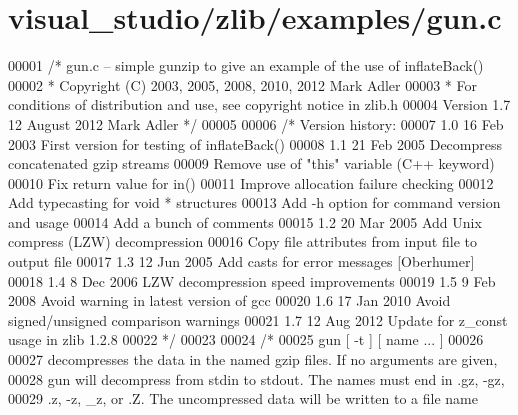 \hypertarget{visual__studio_2zlib_2examples_2gun_8c_source}{}\section{visual\+\_\+studio/zlib/examples/gun.c}
\label{visual__studio_2zlib_2examples_2gun_8c_source}

\begin{DoxyCode}
00001 \textcolor{comment}{/* gun.c -- simple gunzip to give an example of the use of inflateBack()}
00002 \textcolor{comment}{ * Copyright (C) 2003, 2005, 2008, 2010, 2012 Mark Adler}
00003 \textcolor{comment}{ * For conditions of distribution and use, see copyright notice in zlib.h}
00004 \textcolor{comment}{   Version 1.7  12 August 2012  Mark Adler */}
00005 
00006 \textcolor{comment}{/* Version history:}
00007 \textcolor{comment}{   1.0  16 Feb 2003  First version for testing of inflateBack()}
00008 \textcolor{comment}{   1.1  21 Feb 2005  Decompress concatenated gzip streams}
00009 \textcolor{comment}{                     Remove use of "this" variable (C++ keyword)}
00010 \textcolor{comment}{                     Fix return value for in()}
00011 \textcolor{comment}{                     Improve allocation failure checking}
00012 \textcolor{comment}{                     Add typecasting for void * structures}
00013 \textcolor{comment}{                     Add -h option for command version and usage}
00014 \textcolor{comment}{                     Add a bunch of comments}
00015 \textcolor{comment}{   1.2  20 Mar 2005  Add Unix compress (LZW) decompression}
00016 \textcolor{comment}{                     Copy file attributes from input file to output file}
00017 \textcolor{comment}{   1.3  12 Jun 2005  Add casts for error messages [Oberhumer]}
00018 \textcolor{comment}{   1.4   8 Dec 2006  LZW decompression speed improvements}
00019 \textcolor{comment}{   1.5   9 Feb 2008  Avoid warning in latest version of gcc}
00020 \textcolor{comment}{   1.6  17 Jan 2010  Avoid signed/unsigned comparison warnings}
00021 \textcolor{comment}{   1.7  12 Aug 2012  Update for z\_const usage in zlib 1.2.8}
00022 \textcolor{comment}{ */}
00023 
00024 \textcolor{comment}{/*}
00025 \textcolor{comment}{   gun [ -t ] [ name ... ]}
00026 \textcolor{comment}{}
00027 \textcolor{comment}{   decompresses the data in the named gzip files.  If no arguments are given,}
00028 \textcolor{comment}{   gun will decompress from stdin to stdout.  The names must end in .gz, -gz,}
00029 \textcolor{comment}{   .z, -z, \_z, or .Z.  The uncompressed data will be written to a file name}

\end{DoxyCode}
